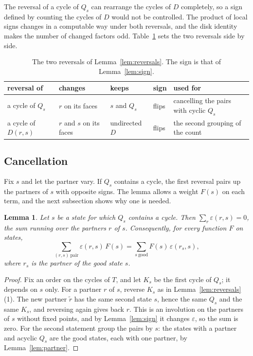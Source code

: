 \documentclass[10pt]{amsart}
\numberwithin{equation}{section}
\newtheorem{lemma}[equation]{Lemma}
\theoremstyle{definition}
\theoremstyle{remark}
\newcommand{\T}{T}
\newcommand{\eps}{\varepsilon}
\begin{document}
The reversal of a cycle of $Q_s$ can rearrange the cycles of $D$ completely, so a sign defined by counting the cycles of $D$ would not be controlled.
The product of local signs changes in a computable way under both reversals, and the disk identity makes the number of changed factors odd.
Table~\ref{tab:reversals} sets the two reversals side by side.

\begin{table}[!htb]
\centering
\begin{tabular}{@{}lllll@{}}
\toprule
reversal of & changes & keeps & sign & used for\\
\midrule
a cycle of $Q_s$ & $r$ on its faces & $s$ and $Q_s$ & flips & cancelling the pairs with cyclic $Q_s$\\
a cycle of $D(r,s)$ & $r$ and $s$ on its faces & undirected $D$ & flips & the second grouping of the count\\
\bottomrule
\end{tabular}
\vspace{4pt}
\caption{The two reversals of Lemma~\ref{lem:reversals}. The sign is that of Lemma~\ref{lem:sign}.}
\label{tab:reversals}
\end{table}


\subsection*{Cancellation}
Fix $s$ and let the partner vary.
If $Q_s$ contains a cycle, the first reversal pairs up the partners of $s$ with opposite signs.
The lemma allows a weight $F(s)$ on each term, and the next subsection shows why one is needed.

\begin{lemma}\label{lem:cancel}
Let $s$ be a state for which $Q_s$ contains a cycle.
Then $\sum_r\eps(r,s)=0$, the sum running over the partners $r$ of $s$.
Consequently, for every function $F$ on states,
\[
\sum_{(r,s)\ \text{pair}}\eps(r,s)\,F(s)=\sum_{s\ \text{good}}F(s)\,\eps(r_s,s),
\]
where $r_s$ is the partner of the good state $s$.
\end{lemma}

\begin{proof}
Fix an order on the cycles of $\T$, and let $K_s$ be the first cycle of $Q_s$; it depends on $s$ only.
For a partner $r$ of $s$, reverse $K_s$ as in Lemma~\ref{lem:reversals}(1).
The new partner $\tilde r$ has the same second state $s$, hence the same $Q_s$ and the same $K_s$, and reversing again gives back $r$.
This is an involution on the partners of $s$ without fixed points, and by Lemma~\ref{lem:sign} it changes $\eps$, so the sum is zero.
For the second statement group the pairs by $s$: the states with a partner and acyclic $Q_s$ are the good states, each with one partner, by Lemma~\ref{lem:partner}.
\end{proof}
\end{document}
